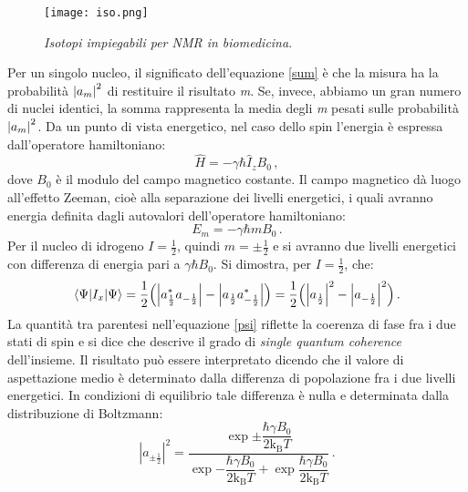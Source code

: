 \documentclass{report}
\renewcommand{\eqref}[1]{equazione \ref{#1}}
\numberwithin{equation}{section}
\numberwithin{figure}{section}
\begin{document}
\begin{wrapfigure}{R}{0.55\textwidth}
    \centering
    \texttt{[image: iso.png]}
    \caption{\textit{Isotopi impiegabili per NMR in biomedicina}.}
    \label{fig:iso}
\end{wrapfigure}

\noindent Per un singolo nucleo, il significato dell'\eqref{sum} è che la misura ha la probabilità $\abs{a_m}^2$ di restituire il risultato \textit{m}. Se, invece, abbiamo un gran numero di nuclei identici, la somma rappresenta la media degli \textit{m} pesati sulle probabilità $\abs{a_m}^2$. Da un punto di vista energetico, nel caso dello spin l'energia è espressa dall'operatore hamiltoniano:
\vspace{4 pt}
\begin{equation}
    \hat{H}=-\gamma \hbar \hat{I}_z B_0\,,
    \label{h}
\end{equation}
dove $B_0$ è il modulo del campo magnetico costante. Il campo magnetico dà luogo all'effetto Zeeman, cioè alla separazione dei livelli energetici, i quali avranno energia definita dagli autovalori dell'operatore hamiltoniano:
\vspace{4 pt}
\begin{equation}
    E_m=-\gamma \hbar m B_0\,.
\end{equation}
Per il nucleo di idrogeno $I=\frac{1}{2}$, quindi $m=\pm \frac{1}{2}$ e si avranno due livelli energetici con differenza di energia pari a $\gamma \hbar B_0$. Si dimostra, per $I=\frac{1}{2}$, che:
\begin{equation}
    \langle \Psi|I_x|\Psi \rangle=\frac{1}{2} \Big(\abs{a_{\frac{1}{2}}^* a_{-\frac{1}{2}}}-\abs{a_{\frac{1}{2}} a_{-\frac{1}{2}}^*} \Big)= \frac{1}{2} \Big(\abs{a_{\frac{1}{2}}}^2-\abs{a_{-\frac{1}{2}}}^2 \Big)\,.
    \label{psi}
\end{equation}
La quantità tra parentesi nell'\eqref{psi} riflette la coerenza di fase fra i due stati di spin e si dice che descrive il grado di \textit{single quantum coherence} dell'insieme. Il risultato può essere interpretato dicendo che il valore di aspettazione medio è determinato dalla differenza di popolazione fra i due livelli energetici. In condizioni di equilibrio tale differenza è nulla e determinata dalla distribuzione di Boltzmann:
\begin{equation}
    |a_{\pm \frac{1}{2}}|^2 = \frac{\exp{\pm \dfrac{\hbar \gamma B_0}{2\mathrm{k_B}T}}}{\exp{-\dfrac{\hbar \gamma B_0}{2\mathrm{k_B}T}}+\exp{\dfrac{\hbar \gamma B_0}{2\mathrm{k_B}T}}}\,.
\end{equation}
\end{document}
